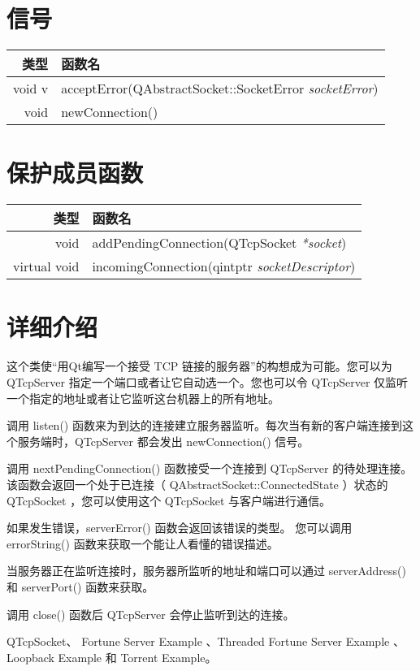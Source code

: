 \section{信号}

\begin{tabular}{|r|l|}
	\hline
	类型	 & 函数名 \\
	\hline
void	v & acceptError(QAbstractSocket::SocketError \emph{socketError}) \\
\hline
void	 & newConnection() \\
	\hline 
\end{tabular}

\section{保护成员函数}

\begin{tabular}{|r|l|}
	\hline
	类型	 & 函数名 \\
	\hline
void	 &  addPendingConnection(QTcpSocket \emph{*socket}) \\ 
\hline
virtual void	 & incomingConnection(qintptr \emph{socketDescriptor}) \\ 
	\hline 
\end{tabular}

\section{详细介绍}

这个类使“用Qt编写一个接受 TCP 链接的服务器”的构想成为可能。您可以为 QTcpServer 指定一个端口或者让它自动选一个。您也可以令 QTcpServer 仅监听一个指定的地址或者让它监听这台机器上的所有地址。

调用 listen() 函数来为到达的连接建立服务器监听。每次当有新的客户端连接到这个服务端时，QTcpServer 都会发出 newConnection() 信号。

调用 nextPendingConnection() 函数接受一个连接到 QTcpServer 的待处理连接。 该函数会返回一个处于已连接（ QAbstractSocket::ConnectedState ）状态的 QTcpSocket ，您可以使用这个 QTcpSocket 与客户端进行通信。

如果发生错误，serverError() 函数会返回该错误的类型。 您可以调用 errorString() 函数来获取一个能让人看懂的错误描述。

当服务器正在监听连接时，服务器所监听的地址和端口可以通过 serverAddress() 和 serverPort() 函数来获取。

调用 close() 函数后 QTcpServer 会停止监听到达的连接。

\begin{notice}[另请参阅]
QTcpSocket、 Fortune Server Example 、Threaded Fortune Server Example 、Loopback Example 和 Torrent Example。
\end{notice}


